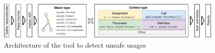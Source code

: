 \begin{figure}[htp!]
    \centering
    \includegraphics[width=\textwidth]{assets/figures/chapter4/go-geiger-architecture.pdf}
    \caption{Architecture of the \toolGeiger{} tool to detect unsafe usages}
    \label{fig:geiger-architecture}
\end{figure}
